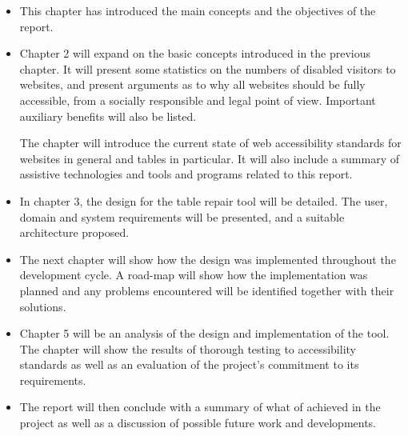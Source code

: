 \begin{itemize}

\item This chapter has introduced the main concepts and the objectives of the report.

\item Chapter 2 will expand on the basic concepts introduced in the previous
chapter.  It will present some statistics on the numbers of disabled visitors
to websites, and present arguments as to why all websites should be fully
accessible, from a socially responsible and legal point of view. Important auxiliary
benefits will also be listed. 

The chapter will introduce the current state of web accessibility standards for
websites in general and tables in particular. It will also include a summary of
assistive technologies and tools and programs related to this report.

\item In chapter 3, the design for the table repair tool will be detailed. The 
user, domain and system requirements will be presented, and a suitable
architecture proposed.

\item The next chapter will show how the design was implemented throughout
the development cycle. A road-map will show how the implementation was planned
and any problems encountered will be identified together with their solutions.

\item Chapter 5 will be an analysis of the design and implementation of the
tool.  The chapter will show the results of thorough testing to accessibility
standards as well as an evaluation of the project's commitment to its
requirements.

\item 
The report will then conclude with a summary of what of achieved in the project
as well as a discussion of possible future work and developments.

\end{itemize}

